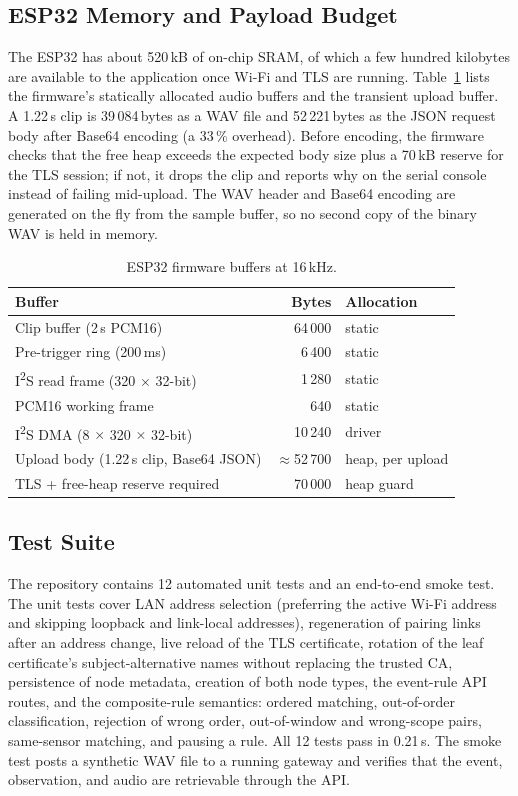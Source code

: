 \documentclass[conference]{IEEEtran}
\newcommand{\ms}{\,ms}
\begin{document}
\subsection{ESP32 Memory and Payload Budget}
The ESP32 has about 520\,kB of on-chip SRAM, of which a few hundred kilobytes are available to the application once Wi-Fi and TLS are running. Table~\ref{tab:mem} lists the firmware's statically allocated audio buffers and the transient upload buffer. A 1.22\,s clip is 39\,084\,bytes as a WAV file and 52\,221\,bytes as the JSON request body after Base64 encoding (a 33\,\% overhead). Before encoding, the firmware checks that the free heap exceeds the expected body size plus a 70\,kB reserve for the TLS session; if not, it drops the clip and reports why on the serial console instead of failing mid-upload. The WAV header and Base64 encoding are generated on the fly from the sample buffer, so no second copy of the binary WAV is held in memory.

\begin{table}[!t]
\centering
\caption{ESP32 firmware buffers at 16\,kHz.}
\label{tab:mem}
\renewcommand{\arraystretch}{1.1}
\footnotesize
\begin{tabular}{@{}l r l@{}}
\toprule
\textbf{Buffer} & \textbf{Bytes} & \textbf{Allocation} \\
\midrule
Clip buffer (2\,s PCM16) & 64\,000 & static \\
Pre-trigger ring (200\ms) & 6\,400 & static \\
I\textsuperscript{2}S read frame (320 $\times$ 32-bit) & 1\,280 & static \\
PCM16 working frame & 640 & static \\
I\textsuperscript{2}S DMA (8 $\times$ 320 $\times$ 32-bit) & 10\,240 & driver \\
Upload body (1.22\,s clip, Base64 JSON) & $\approx$52\,700 & heap, per upload \\
TLS + free-heap reserve required & 70\,000 & heap guard \\
\bottomrule
\end{tabular}
\end{table}

\subsection{Test Suite}
The repository contains 12 automated unit tests and an end-to-end smoke test. The unit tests cover LAN address selection (preferring the active Wi-Fi address and skipping loopback and link-local addresses), regeneration of pairing links after an address change, live reload of the TLS certificate, rotation of the leaf certificate's subject-alternative names without replacing the trusted CA, persistence of node metadata, creation of both node types, the event-rule API routes, and the composite-rule semantics: ordered matching, out-of-order classification, rejection of wrong order, out-of-window and wrong-scope pairs, same-sensor matching, and pausing a rule. All 12 tests pass in 0.21\,s. The smoke test posts a synthetic WAV file to a running gateway and verifies that the event, observation, and audio are retrievable through the API.
\end{document}
